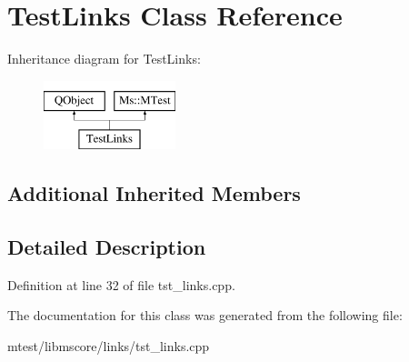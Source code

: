 \hypertarget{class_test_links}{}\section{Test\+Links Class Reference}
\label{class_test_links}
Inheritance diagram for Test\+Links\+:\begin{figure}[H]
\begin{center}
\leavevmode
\includegraphics[height=2.000000cm]{class_test_links}
\end{center}
\end{figure}
\subsection*{Additional Inherited Members}


\subsection{Detailed Description}


Definition at line 32 of file tst\+\_\+links.\+cpp.



The documentation for this class was generated from the following file\+:\begin{DoxyCompactItemize}
\item 
mtest/libmscore/links/tst\+\_\+links.\+cpp\end{DoxyCompactItemize}
